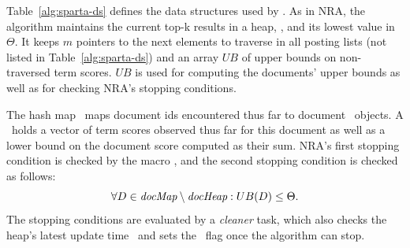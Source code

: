 
Table~\ref{alg:sparta-ds} defines the data structures used by \alg.
As in NRA, the algorithm maintains the current top-k results in a heap, \DHeap, and its lowest value in $\Theta$. It keeps $m$ pointers to the next elements to traverse in all posting lists (not listed in Table~\ref{alg:sparta-ds})
and an array $UB$ of upper bounds on non-traversed term scores. 
$UB$ is used for computing the documents' upper bounds 
as well as for checking NRA's  stopping conditions.   

The hash map 
\DMap\ maps  document ids encountered thus far to document \Docobj\ objects. A \Docobj\ holds a vector of term scores observed thus far for this document as well as a lower bound on the document score computed as their sum.
NRA's first stopping condition is checked by the macro \RAStop, and the 
second stopping condition is checked as follows: 
\begin{equation} \label{eq:stop2}
\forall D\in \textit{docMap} \setminus \textit{docHeap} : UB(D) \le \Theta.
\end{equation}
The stopping conditions are evaluated by a \emph{cleaner} task,
which also checks the heap's latest update time \HeapUpdateTime\ and 
sets the \Done\ flag once the algorithm can stop.

